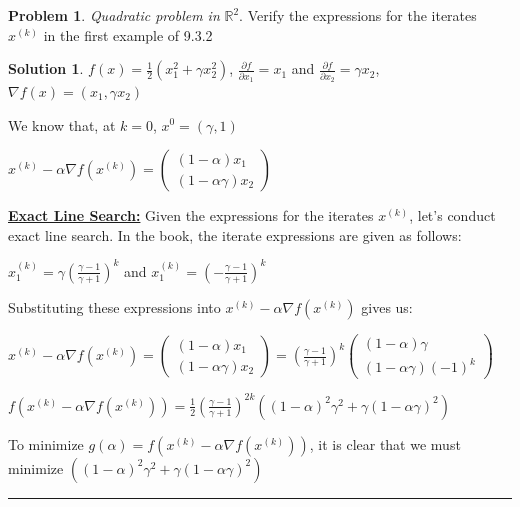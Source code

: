 \documentclass{article}
\theoremstyle{definition}
\newtheorem{problem}{Problem}
\def\fline{\rule{0.75\linewidth}{0.5pt}}
\newcommand{\finishline}{\begin{center}\fline\end{center}}
\newtheorem*{solution*}{Solution}
\newenvironment{solution}{\begin{solution*}}{{\finishline} \end{solution*}}
\begin{document}
\begin{problem} \textit{Quadratic problem in } $\mathbb{R}^2.$  Verify the expressions for the iterates $x^{(k)}$ in the first example of 9.3.2

\begin{solution} 
$f(x) = \frac{1}{2} (x_1^2 + \gamma x_2^2)$, $\frac{\partial{f}}{\partial{x_1}} = x_1$ and $\frac{\partial{f}}{\partial{x_2}} = \gamma x_2$, $\nabla f(x) = (x_1, \gamma x_2)$ \newline 

We know that, at $k = 0$, $x^0 = (\gamma, 1)$ \newline 


$x^{(k)} - \alpha \nabla f(x^{(k)}) = \begin{pmatrix}
(1 - \alpha) x_1 \\
(1 - \alpha \gamma) x_2
\end{pmatrix}$

\textbf{\underline{Exact Line Search:}} \newline 
Given the expressions for the iterates $x^{(k)}$, let's conduct exact line search. In the book, the iterate expressions are given as follows: \newline 

$x_1^{(k)} = \gamma (\frac{\gamma - 1}{\gamma + 1})^k$ and $x_1^{(k)} = (-\frac{\gamma - 1}{\gamma + 1})^k$

Substituting these expressions into $x^{(k)} - \alpha \nabla f(x^{(k)})$ gives us: \newline 

$x^{(k)} - \alpha \nabla f(x^{(k)}) = \begin{pmatrix}
(1 - \alpha) x_1 \\
(1 - \alpha \gamma) x_2
\end{pmatrix} = (\frac{\gamma - 1}{\gamma + 1})^k \begin{pmatrix}
(1 - \alpha) \gamma \\
(1 - \alpha \gamma) (-1)^k
\end{pmatrix}$ \newline 

$f(x^{(k)} - \alpha \nabla f(x^{(k)})) = \frac{1}{2} (\frac{\gamma - 1}{\gamma + 1})^{2k} ((1 - \alpha)^2 \gamma^2 + \gamma (1 - \alpha \gamma)^2)$ \newline 

To minimize $g(\alpha) = f(x^{(k)} - \alpha \nabla f(x^{(k)}))$, it is clear that we must minimize $((1 - \alpha)^2 \gamma^2 + \gamma (1 - \alpha \gamma)^2)$


\end{solution}
\end{problem}
\end{document}

